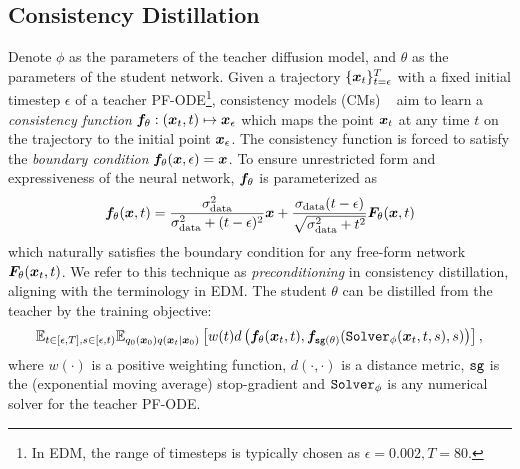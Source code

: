 \subsection{Consistency Distillation}
Denote $\phi$ as the parameters of the teacher diffusion model, and $\theta$ as the parameters of the student network. Given a trajectory $\{\bm{x}_t\}_{t=\epsilon}^{T}$ with a fixed initial timestep $\epsilon$ of a teacher PF-ODE\footnote{In EDM, the range of timesteps is typically chosen as $\epsilon=0.002,T=80$.}, consistency models (CMs) ~\citep{song2023consistency} aim to learn a \textit{consistency function} $\bm{f}_\theta: (\bm{x}_t, t) \mapsto \bm{x}_{\epsilon}$ which maps the point $\bm{x}_t$ at any time $t$ on the trajectory to the initial point $\bm{x}_\epsilon$. The consistency function is forced to satisfy the \textit{boundary condition} $\bm{f}_{\theta}(\bm{x}, \epsilon) = \bm{x}$. To ensure unrestricted form and expressiveness of the neural network, $\bm{f}_\theta$ is parameterized as
\begin{equation}
\label{eq:cm-precond}
    \bm{f}_\theta(\bm{x},t)=\frac{\sigma_{\text{data}}^2}{\sigma_{\text{data}}^2+(t-\epsilon)^2}\bm{x}+\frac{\sigma_{\text{data}} (t-\epsilon)}{\sqrt{\sigma_{\text{data}}^2+t^2}}\bm{F}_\theta(\bm{x},t)
\end{equation}
which naturally satisfies the boundary condition for any free-form network $\bm{F}_\theta(\bm{x}_t,t)$. We refer to this technique as \textit{preconditioning} in consistency distillation, aligning with the terminology in EDM. 
The student $\theta$ can be distilled from the teacher by the training objective:
\begin{equation}
\label{eq:loss-cm}
\mathbb{E}_{t\in[\epsilon,T],s\in[\epsilon,t)}\mathbb{E}_{q_0(\bm{x}_0)q(\bm{x}_t|\bm{x}_0)}\left[w(t)d\left(\bm{f}_{\theta}(\bm{x}_t, t),\bm{f}_{\texttt{sg}(\theta)}(\texttt{Solver}_\phi(\bm{x}_t,t,s), s)\right)\right],
\end{equation}
where $w(\cdot)$ is a positive weighting function, $d(\cdot,\cdot)$ is a distance metric, $\texttt{sg}$ is the (exponential moving average) stop-gradient and $\texttt{Solver}_\phi$ is any numerical solver for the teacher PF-ODE.

